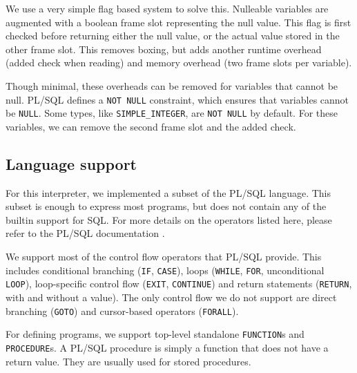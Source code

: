 \documentclass[twoside,11pt,a4paper]{article}
\newcommand{\java}[1]{\textsf{#1}}
\newcommand{\pls}[1]{\small\texttt{#1}\normalsize}
\newcommand{\plstype}[1]{\pls{#1}}
\newcommand{\simpleint}{\plstype{SIMPLE\_INTEGER}}
\newcommand{\plsnull}{\pls{NULL}}
\begin{document}
We use a very simple flag based system to solve this. Nulleable variables are augmented with a \java{boolean} frame slot representing the null value. This flag is first checked before returning either the null value, or the actual value stored in the other frame slot. This removes boxing, but adds another runtime overhead (added check when reading) and memory overhead (two frame slots per variable).

Though minimal, these overheads can be removed for variables that cannot be null. PL/SQL defines a \pls{NOT NULL} constraint, which ensures that variables cannot be \plsnull{}. Some types, like \simpleint{}, are \pls{NOT NULL} by default. For these variables, we can remove the second frame slot and the added check.

\subsection{Language support}


For this interpreter, we implemented a subset of the PL/SQL language. This subset is enough to express most programs, but does not contain any of the builtin support for SQL. For more details on the operators listed here, please refer to the PL/SQL documentation \cite{plsdoc}.

We support most of the control flow operators that PL/SQL provide. This includes conditional branching (\pls{IF}, \pls{CASE}), loops (\pls{WHILE}, \pls{FOR}, unconditional \pls{LOOP}), loop-specific control flow (\pls{EXIT}, \pls{CONTINUE}) and return statements (\pls{RETURN}, with and without a value). The only control flow we do not support are direct branching (\pls{GOTO}) and cursor-based operators (\pls{FORALL}).

For defining programs, we support top-level standalone \pls{FUNCTION}s and \pls{PROCEDURE}s. A PL/SQL procedure is simply a function that does not have a return value. They are usually used for stored procedures.
\end{document}
